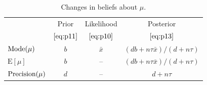 {\begin{table}[ht]
\bigskip

\begin{tabular}{|l|c|c|c|}
\cline{2-4}
\multicolumn{1}{c|}{~}& Prior & Likelihood & Posterior \\
\multicolumn{1}{c|}{~}& $\eqref{eq:p11}$ & $\eqref{eq:p10}$ & $\eqref{eq:p13}$ \\
\hline
$\textnormal{Mode}(\mu)$ & $b$ & $\bar x$ & $(db+n\tau\bar x)/(d+n\tau)$ \\
$\text{E}[\mu]$ & $b$ & -- & $(db+n\tau\bar x)/(d+n\tau)$ \\
$\textnormal{Precision}(\mu)$ & $d$ & -- & $d+n\tau$ \\
\hline
\end{tabular}
\caption{Changes in beliefs about $\mu$.}
\label{tab:norknown}

\end{table}}



